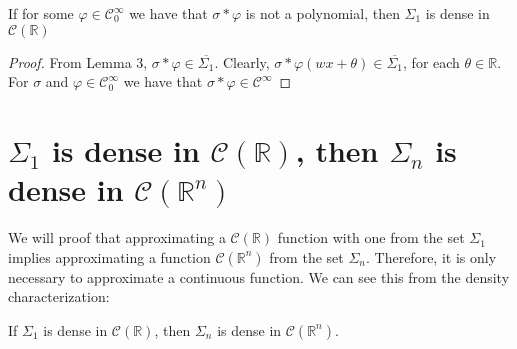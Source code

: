 \documentclass[../main.tex]{subfiles}
\begin{document}
	\begin{lema} %
		If for some $\varphi \in \mathcal{C}^\infty_0 $ we have that $\sigma \ast \varphi $ is not a polynomial, then $\Sigma_1$ is dense in $\mathcal{C}(\mathbb{R})$
	\end{lema}
	 \begin{proof}
	 From Lemma 3, $\sigma \ast \varphi \in  \overline{\Sigma_1}$. Clearly, $\sigma \ast \varphi (wx+\theta ) \in  \overline{\Sigma_1}$, for each $\theta \in \mathbb{R}$. For $\sigma$ and $\varphi \in \mathcal{C}^\infty_0$ we have that $\sigma \ast \varphi \in  \mathcal{C}^\infty $
	 \end{proof}
 \section{{$\Sigma_1$ is dense in $\mathcal{C}(\mathbb{R})$, then $\Sigma_n$ is dense in $\mathcal{C}(\mathbb{R}^n)$ }}
 
 \noindent We will proof that approximating a $\mathcal{C}(\mathbb{R})$ function  with one from the set $\Sigma_1$ implies approximating a function $\mathcal{C}(\mathbb{R}^n)$ from the set $\Sigma_n$. Therefore, it is only necessary to approximate a continuous function. We can see this from the density characterization:

	\begin{lema}  %
			If $\Sigma_1$ is dense in $\mathcal{C}(\mathbb{R})$, then $\Sigma_n$ is dense in $\mathcal{C}(\mathbb{R}^n)$. 
		\end{lema}
	
\end{document}
